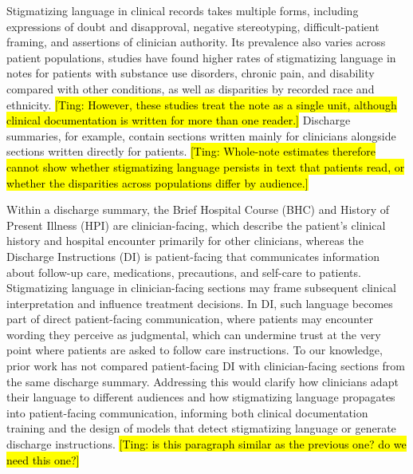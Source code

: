 \documentclass[unnumsec,webpdf,contemporary,large]{oup-authoring-template}
\newcommand{\td}[1]{\sethlcolor{pink}\hl{[Ting: #1]}}
\begin{document}
Stigmatizing language in clinical records takes multiple forms, including expressions of doubt and disapproval, negative stereotyping, difficult-patient framing, and assertions of clinician authority.\cite{park2021,mcarthur2026} Its prevalence also varies across patient populations, studies have found higher rates of stigmatizing language in notes for patients with substance use disorders, chronic pain, and disability compared with other conditions, as well as disparities by recorded race and ethnicity.\cite{himmelstein2022, sun2022} \td{However, these studies treat the note as a single unit, although clinical documentation is written for more than one reader.} %
Discharge summaries, for example, contain sections written mainly for clinicians alongside sections written directly for patients.\cite{li2026readability} \td{Whole-note estimates therefore cannot show whether stigmatizing language persists in text that patients read, or whether the disparities across populations differ by audience.} %

Within a discharge summary, the Brief Hospital Course (BHC) and History of Present Illness (HPI) are clinician-facing, which describe the patient's clinical history and hospital encounter primarily for other clinicians, whereas the Discharge Instructions (DI) is patient-facing that communicates information about follow-up care, medications, precautions, and self-care to patients.\cite{xu2024dischargeme,li2026readability} Stigmatizing language in clinician-facing sections may frame subsequent clinical interpretation and influence treatment decisions.\cite{goddu2018} In DI, such language becomes part of direct patient-facing communication, where patients may encounter wording they perceive as judgmental, \cite{leveille2020notes,li2026readability} which can undermine trust at the very point where patients are asked to follow care instructions. To our knowledge, prior work has not compared patient-facing DI with clinician-facing sections from the same discharge summary. %
Addressing this would clarify how clinicians adapt their language to different audiences and how stigmatizing language propagates into patient-facing communication, informing both clinical documentation training and the design of models that detect stigmatizing language or generate discharge instructions. 
\td{is this paragraph similar as the previous one? do we need this one?}
\end{document}
